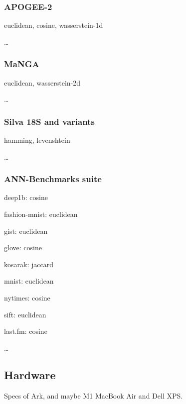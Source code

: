 \subsubsection{APOGEE-2}
\label{subsec:methods:datasets:apogee-2}

euclidean, cosine, wasserstein-1d

\dots

\subsubsection{MaNGA}
\label{subsec:methods:datasets:manga}

euclidean, wasserstein-2d

\dots

\subsubsection{Silva 18S and variants}
\label{subsec:methods:datasets:silva-18s}

hamming, levenshtein

\dots

\subsubsection{ANN-Benchmarks suite}
\label{subsec:methods:datasets:ann-benchmarks-suite}

deep1b: cosine

fashion-mnist: euclidean

gist: euclidean

glove: cosine

kosarak: jaccard

mnist: euclidean

nytimes: cosine

sift: euclidean

last.fm: cosine

\dots

\subsection{Hardware}
\label{subsec:methods:hardware}

Specs of Ark, and maybe M1 MacBook Air and Dell XPS.


